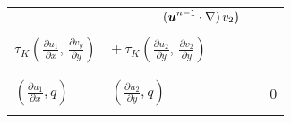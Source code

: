 \documentclass[a4paper,12pt]{article}
\newcommand{\bfu}{\mbox{\boldmath $u$}}
\begin{document}
\begin{landscape}
\begin{figure}[p]
\begin{tabular}{|l|l|l||l|}
& $\displaystyle{\qquad \qquad
    \left. (\bfu^{n-1}\cdot\nabla)\,v_2\right)}$ &  & \\
& & & \\
$\displaystyle{\tau_K\left(\frac{\partial u_1}{\partial x}, \, \frac{\partial v_y}{\partial y} \right)}$ & $\displaystyle{ + \,\tau_K\left(\frac{\partial u_2}{\partial y}, \, \frac{\partial v_2}{\partial y} \right)}$ & & \\
& & & \\
\hline
& & & \\
$\displaystyle{(\frac{\partial u_1}{\partial x}, q)}$ & $\displaystyle{(\frac{\partial u_2}{\partial y}, q)}$ &  & 0 \\
& & & \\
\hline
\end{tabular}
\end{figure}
\end{landscape}
\end{document}
